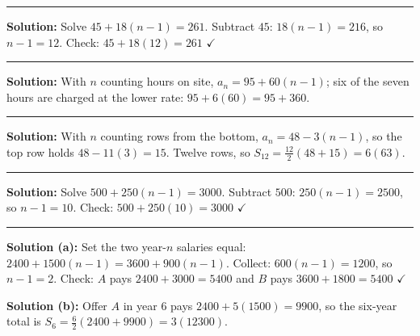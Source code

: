 \documentclass[12pt]{article}
\begin{document}
\vspace{0.2cm}\noindent\rule{\linewidth}{0.2pt}


\textbf{Solution:} Solve $45 + 18(n-1) = 261$. Subtract $45$: $18(n-1) = 216$, so $n - 1 = 12$. Check: $45 + 18(12) = 261$ $\checkmark$ 

\vspace{0.2cm}\noindent\rule{\linewidth}{0.2pt}


\textbf{Solution:} With $n$ counting hours on site, $a_n = 95 + 60(n-1)$; six of the seven hours are charged at the lower rate: $95 + 6(60) = 95 + 360$. 

\vspace{0.2cm}\noindent\rule{\linewidth}{0.2pt}


\textbf{Solution:} With $n$ counting rows from the bottom, $a_n = 48 - 3(n-1)$, so the top row holds $48 - 11(3) = 15$. Twelve rows, so $S_{12} = \frac{12}{2}(48 + 15) = 6(63)$. 

\vspace{0.2cm}\noindent\rule{\linewidth}{0.2pt}


\textbf{Solution:} Solve $500 + 250(n-1) = 3000$. Subtract $500$: $250(n-1) = 2500$, so $n - 1 = 10$. Check: $500 + 250(10) = 3000$ $\checkmark$ 

\vspace{0.2cm}\noindent\rule{\linewidth}{0.2pt}


\textbf{Solution (a):} Set the two year-$n$ salaries equal: $2400 + 1500(n-1) = 3600 + 900(n-1)$. Collect: $600(n-1) = 1200$, so $n - 1 = 2$. Check: $A$ pays $2400 + 3000 = 5400$ and $B$ pays $3600 + 1800 = 5400$ $\checkmark$ 

\textbf{Solution (b):} Offer $A$ in year $6$ pays $2400 + 5(1500) = 9900$, so the six-year total is $S_6 = \frac{6}{2}(2400 + 9900) = 3(12300)$. 
\end{document}
